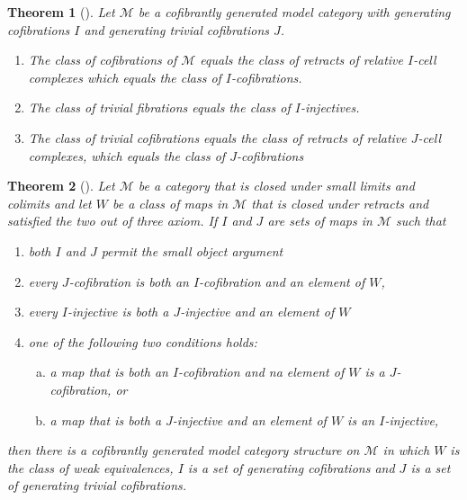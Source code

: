 \documentclass{scrartcl}
\theoremstyle{plain}
\newtheorem{theorem}{Theorem}[section]
\theoremstyle{definition}
\newcommand{\cat}[1]{\mathcal{#1}}
\begin{document}
\begin{theorem}[{\cite[11.2.1]{hirschhorn2003model}}]
    Let $\cat M$ be a cofibrantly generated model category with generating cofibrations $I$ and generating trivial cofibrations $J$.
    \begin{enumerate}
        \item The class of cofibrations of $\cat M$ equals the class of retracts of relative $I$-cell complexes which equals the class of $I$-cofibrations.
        \item The class of trivial fibrations equals the class of $I$-injectives.
        \item The class of trivial cofibrations equals the class of retracts of relative $J$-cell complexes, which equals the class of $J$-cofibrations
    \end{enumerate}
\end{theorem}

\begin{theorem}[{\cite[11.3.1]{hirschhorn2003model}}]
    Let $\cat M$ be a category that is closed under small limits and colimits and let $W$ be a class of maps in $\cat M$ that is closed under retracts and satisfied the two out of three axiom. If $I$ and $J$ are sets of maps in $\cat M$ such that 
    \begin{enumerate}
        \item both $I$ and $J$ permit the small object argument
        \item every $J$-cofibration is both an $I$-cofibration and an element of $W$,
        \item every $I$-injective is both a $J$-injective and an element of $W$
        \item one of the following two conditions holds:
        \begin{enumerate}[(a)]
            \item a map that is both an $I$-cofibration and na element of $W$ is a $J$-cofibration, or
            \item a map that is both a $J$-injective and an element of $W$ is an $I$-injective,
        \end{enumerate}
    \end{enumerate}
    then there is a cofibrantly generated model category structure on $\cat M$ in which $W$ is the class of weak equivalences, $I$ is a set of generating cofibrations and $J$ is a set of generating trivial cofibrations. 
\end{theorem}
\end{document}
